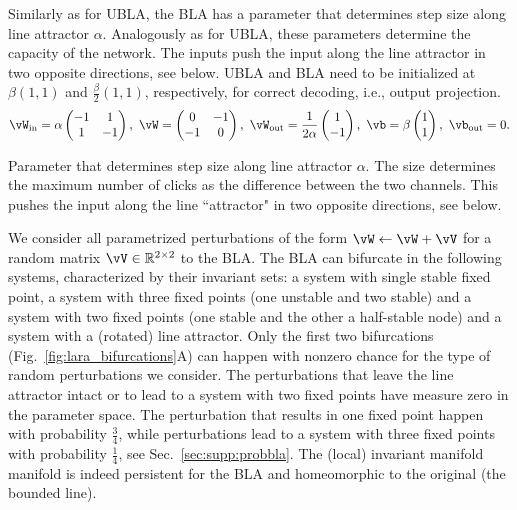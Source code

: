 \documentclass{article} %
\newcounter{ct}
\newcommand{\win}{\vW_{\text{in}}}
\newcommand{\wout}{\vW_{\text{out}}}
\newcommand{\bout}{\vb_{\text{out}}}
\theoremstyle{definition}
\theoremstyle{remark}
\begin{document}
Similarly as for UBLA, the BLA has a parameter that determines step size along line attractor $\alpha$. Analogously as for UBLA, these parameters determine the capacity of the network.
The inputs push the input along the line attractor in two opposite directions, see below. UBLA and BLA need to be initialized at $\beta(1,1)$ and $\tfrac{\beta}{2}(1,1)$, respectively, for correct decoding, i.e., output projection.
\begin{equation}\label{eq:bla}
\win = \alpha
\begin{pmatrix}
-1  &  1 \\
1  &  -1
\end{pmatrix}, \
\vW = 
\begin{pmatrix}
0  &  -1 \\
-1  &  0
\end{pmatrix}, \
\wout = \frac{1}{2\alpha}
\begin{pmatrix}
1  \\  -1 
\end{pmatrix}, \
\vb = \beta
\begin{pmatrix}
1 \\  1 
\end{pmatrix}, \
\bout = 0.
\end{equation}


Parameter that determines step size along line attractor $\alpha$.
The size determines the maximum number of clicks as the difference between the two channels. 
This pushes the input along the line ``attractor" in two opposite directions, %
see below.


We consider all parametrized perturbations of the form $ \vW \leftarrow \vW + \vV$ for a random matrix $\vV\in \mathbb{R}^{2\times 2}$ to the BLA.
The BLA can bifurcate in the following systems, characterized by their invariant sets: a system with single stable fixed point, a system with three fixed points (one unstable and two stable) and  a system with two fixed points (one stable and the other a half-stable node) and a system with a (rotated) line attractor. 
Only the first two bifurcations (Fig.~\ref{fig:lara_bifurcations}A) can happen with nonzero chance for the type of random perturbations we consider.
The perturbations that leave the line attractor intact or to lead to a system with two fixed points have measure zero in the parameter space.
The perturbation that results in one fixed point happen with probability $\frac{3}{4}$, while perturbations lead to a system with three fixed points with probability $\frac{1}{4}$, see Sec.~\ref{sec:supp:probbla}.
The (local) %
 invariant manifold manifold is indeed persistent for the BLA and homeomorphic to the original (the bounded line).
\end{document}
